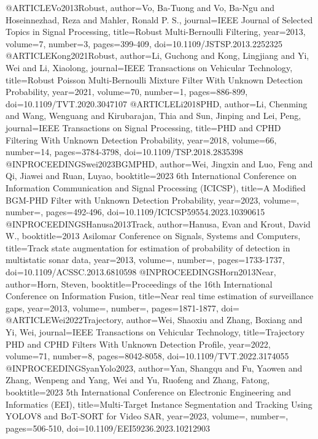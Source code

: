 @ARTICLE{Vo2013Robust,
author={Vo, Ba-Tuong and Vo, Ba-Ngu and Hoseinnezhad, Reza and Mahler, Ronald P. S.},
journal={IEEE Journal of Selected Topics in Signal Processing},
title={Robust Multi-{B}ernoulli Filtering},
year={2013},
volume={7},
number={3},
pages={399-409},
doi={10.1109/JSTSP.2013.2252325}
}
@ARTICLE{Kong2021Robust,
author={Li, Guchong and Kong, Lingjiang and Yi, Wei and Li, Xiaolong},
journal={IEEE Transactions on Vehicular Technology},
title={Robust {P}oisson Multi-{B}ernoulli Mixture Filter With Unknown Detection Probability},
year={2021},
volume={70},
number={1},
pages={886-899},
doi={10.1109/TVT.2020.3047107}
}
@ARTICLE{Li2018PHD,
author={Li, Chenming and Wang, Wenguang and Kirubarajan, Thia and Sun, Jinping and Lei, Peng},
journal={IEEE Transactions on Signal Processing},
title={{PHD} and {CPHD} Filtering With Unknown Detection Probability},
year={2018},
volume={66},
number={14},
pages={3784-3798},
doi={10.1109/TSP.2018.2835398}}
@INPROCEEDINGS{wei2023BGMPHD,
author={Wei, Jingxin and Luo, Feng and Qi, Jiawei and Ruan, Luyao},
booktitle={2023 6th International Conference on Information Communication and Signal Processing (ICICSP)},
title={A Modified {BGM}-{PHD} Filter with Unknown Detection Probability},
year={2023},
volume={},
number={},
pages={492-496},
doi={10.1109/ICICSP59554.2023.10390615}}
@INPROCEEDINGS{Hanusa2013Track,
author={Hanusa, Evan and Krout, David W.},
booktitle={2013 Asilomar Conference on Signals, Systems and Computers},
title={Track state augmentation for estimation of probability of detection in multistatic sonar data},
year={2013},
volume={},
number={},
pages={1733-1737},
doi={10.1109/ACSSC.2013.6810598}}
@INPROCEEDINGS{Horn2013Near,
author={Horn, Steven},
booktitle={Proceedings of the 16th International Conference on Information Fusion},
title={Near real time estimation of surveillance gaps},
year={2013},
volume={},
number={},
pages={1871-1877},
doi={}}
@ARTICLE{Wei2022Trajectory,
author={Wei, Shaoxiu and Zhang, Boxiang and Yi, Wei},
journal={IEEE Transactions on Vehicular Technology},
title={Trajectory {PHD} and {CPHD} Filters With Unknown Detection Profile},
year={2022},
volume={71},
number={8},
pages={8042-8058},
doi={10.1109/TVT.2022.3174055}}
@INPROCEEDINGS{yanYolo2023,
author={Yan, Shangqu and Fu, Yaowen and Zhang, Wenpeng and Yang, Wei and Yu, Ruofeng and Zhang, Fatong},
booktitle={2023 5th International Conference on Electronic Engineering and Informatics (EEI)},
title={Multi-Target Instance Segmentation and Tracking Using {YOLOV8} and {BoT-SORT} for Video {SAR}},
year={2023},
volume={},
number={},
pages={506-510},
doi={10.1109/EEI59236.2023.10212903}}

